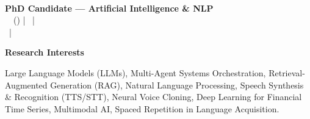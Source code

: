 \documentclass[11pt,a4paper]{article}
\newcommand{\itemspace}{\vspace{0.4em}}
\newcommand{\sectionspace}{\itemspace}
\newcommand{\cvsection}[1]{
    \sectionspace
    \noindent\textcolor{primary}{\Large \textbf{#1}} \textcolor{primary}{\hrulefill}
    \par\vspace{0.4em}
}
\begin{document}
\begin{center}
    {\huge \textcolor{primary}{\textbf{\cvname}}}\\
    \vspace{0.1cm}
    \textcolor{primary}{\textbf{PhD Candidate — Artificial Intelligence \& NLP}}\\
    \vspace{0.2cm}
    \textcolor{primary}{\faMapMarker*} \ \cvlocation\ (\cvmobility) \quad|\quad
    \textcolor{primary}{\faEnvelope} \ \cvemail \quad|\quad
    \textcolor{primary}{\faPhone} \ \cvphone \\
    \vspace{0.1cm}
    \textcolor{primary}{\faLinkedin} \ \cvlinkedin \quad|\quad
    \textcolor{primary}{\faGithub} \ \cvgithub
\end{center}

\cvsection{Research Interests}
Large Language Models (LLMs), Multi-Agent Systems Orchestration, Retrieval-Augmented Generation (RAG), Natural Language Processing, Speech Synthesis \& Recognition (TTS/STT), Neural Voice Cloning, Deep Learning for Financial Time Series, Multimodal AI, Spaced Repetition in Language Acquisition.
\end{document}
